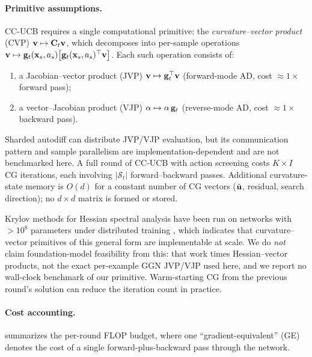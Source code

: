 \documentclass[twoside]{article}
\begin{document}
\paragraph{Primitive assumptions.}
CC-UCB requires a single computational primitive: the
\emph{curvature--vector product} (CVP) $\mathbf{v}\mapsto\mathbf{C}_t\mathbf{v}$, which
decomposes into per-sample operations
$\mathbf{v}\mapsto\mathbf{g}_t(\mathbf{x}_s,a_s)\bigl[\mathbf{g}_t(\mathbf{x}_s,a_s)^\top\mathbf{v}\bigr]$.
Each such operation consists of:
\begin{enumerate}[nosep,leftmargin=1.5em]
\item a Jacobian--vector product (JVP) $\mathbf{v}\mapsto\mathbf{g}_t^\top\mathbf{v}$
  (forward-mode AD, cost $\approx 1\times$ forward pass);
\item a vector--Jacobian product (VJP) $\alpha\mapsto\alpha\,\mathbf{g}_t$
  (reverse-mode AD, cost $\approx 1\times$ backward pass).
\end{enumerate}
Sharded autodiff can distribute JVP/VJP evaluation, but its communication
pattern and sample parallelism are implementation-dependent and are not
benchmarked here.
A full round of CC-UCB with action screening costs $K\times I$ CG
iterations, each involving $|\mathcal{S}_t|$ forward--backward passes.
Additional curvature-state memory is $O(d)$ for a constant number of CG vectors
($\tilde{\mathbf{u}}$, residual, search direction); no $d\times d$ matrix is formed
or stored.

Krylov methods for Hessian spectral analysis have been run on networks with
$>10^8$ parameters under distributed training \citep{granziol2026hessian}, which
indicates that curvature--vector primitives of this general form are implementable
at scale.  We do \emph{not} claim foundation-model feasibility from this: that
work times Hessian--vector products, not the exact per-example GGN JVP/VJP used
here, and we report no wall-clock benchmark of our primitive.
Warm-starting CG from the previous round's solution can reduce the
iteration count in practice.

\paragraph{Cost accounting.}
 summarizes the per-round FLOP budget, where one
``gradient-equivalent'' (GE) denotes the cost of a single
forward-plus-backward pass through the network.
\end{document}
